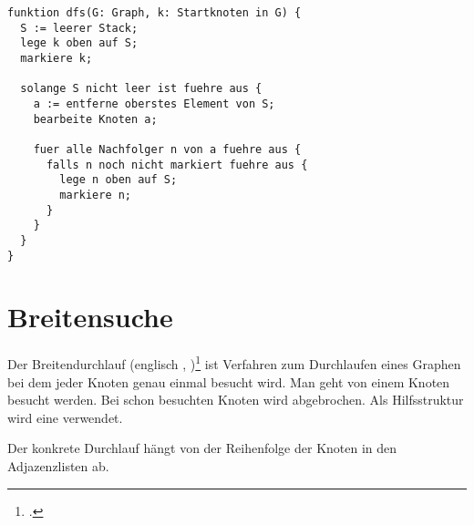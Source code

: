 \documentclass{lehramt-informatik-haupt}
\begin{document}
\begin{verbatim}
funktion dfs(G: Graph, k: Startknoten in G) {
  S := leerer Stack;
  lege k oben auf S;
  markiere k;

  solange S nicht leer ist fuehre aus {
    a := entferne oberstes Element von S;
    bearbeite Knoten a;

    fuer alle Nachfolger n von a fuehre aus {
      falls n noch nicht markiert fuehre aus {
        lege n oben auf S;
        markiere n;
      }
    }
  }
}
\end{verbatim}


%

\section{Breitensuche}

\begin{liQuellen}
\item \cite[Seite 53-64 (PDF 46-57)]{aud:fs:6}
\item \cite[Kapitel 6.2.2.2 Graphalgorithmen, Seite 185]{schneider}
\item \cite{wiki:breitensuche}
\end{liQuellen}

Der Breitendurchlauf (englisch ,
)\footcite{wiki:breitensuche}  ist Verfahren zum Durchlaufen
eines Graphen bei dem jeder Knoten genau einmal besucht wird. Man geht
von einem Knoten   besucht werden. Bei schon besuchten Knoten wird abgebrochen.
Als Hilfsstruktur wird eine  verwendet.

Der konkrete Durchlauf hängt von der Reihenfolge der Knoten in den
Adjazenzlisten ab.

\begin{center}
\end{center}
\end{document}
